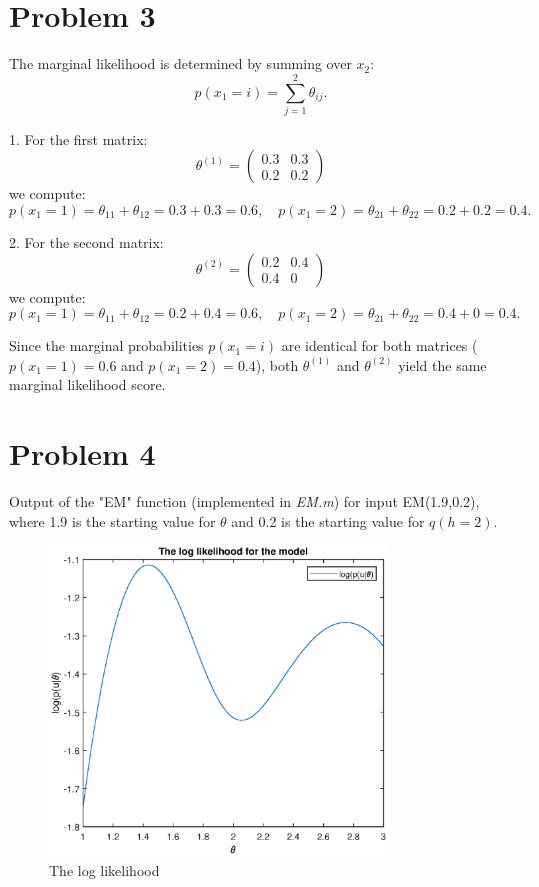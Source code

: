 \documentclass{article}
\begin{document}
\section*{Problem 3} 

The marginal likelihood is determined by summing over \(x_2\):
\[
p(x_1 = i) = \sum_{j=1}^{2} \theta_{ij}.
\]

1. For the first matrix:
\[
\theta^{(1)} =
\begin{pmatrix}
0.3 & 0.3 \\
0.2 & 0.2
\end{pmatrix}
\]
we compute:
\[
p(x_1 = 1) = \theta_{11} + \theta_{12} = 0.3 + 0.3 = 0.6, \quad 
p(x_1 = 2) = \theta_{21} + \theta_{22} = 0.2 + 0.2 = 0.4.
\]

2. For the second matrix:
\[
\theta^{(2)} =
\begin{pmatrix}
0.2 & 0.4 \\
0.4 & 0
\end{pmatrix}
\]
we compute:
\[
p(x_1 = 1) = \theta_{11} + \theta_{12} = 0.2 + 0.4 = 0.6, \quad 
p(x_1 = 2) = \theta_{21} + \theta_{22} = 0.4 + 0 = 0.4.
\]

Since the marginal probabilities \(p(x_1 = i)\) are identical for both matrices (\(p(x_1 = 1) = 0.6\) and \(p(x_1 = 2) = 0.4\)), both \(\theta^{(1)}\) and \(\theta^{(2)}\) yield the same marginal likelihood score.



\section*{Problem 4}

Output of the "EM" function (implemented in \textit{EM.m}) for input EM(1.9,0.2), where 1.9 is the starting value for $\theta$ and 0.2 is the starting value for $q(h=2)$.

\begin{figure}[H]
    \centering
    \includegraphics[width=0.8\textwidth]{log_likelihood.eps} %
    \caption{The log likelihood}
\end{figure}
\end{document}
